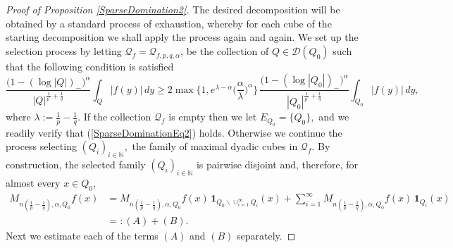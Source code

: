 \documentclass[11pt, a4paper,leqno]{amsart}
\theoremstyle{plain}
\numberwithin{equation}{section}
\theoremstyle{definition}
\theoremstyle{remark}
\begin{document}
\begin{proof}
[Proof of Proposition \ref{SparseDomination2}]The desired decomposition will
be obtained by a standard process of exhaustion, whereby for each cube of the
starting decomposition we shall apply the process again and again. We set up
the selection process by letting $\mathcal{Q}_{f}=\mathcal{Q}_{f,p,q,\alpha}$,
be the collection of  $Q\in \mathcal{D}( Q_{0})$ such that the
following condition is satisfied%
\begin{equation}
\frac{\big(1-(\log|Q|)_{-}\big)^{\alpha}}{|Q|^{\frac{1}{p^{\prime}}+\frac
{1}{q}}}\int_{Q}|f(y)|\,dy\geq2\max\bigg\{1,e^{\lambda-\alpha}\bigg(\frac
{\alpha}{\lambda}\bigg)^{\alpha}\bigg\}\,\frac{\big(1-(\log|Q_{0}%
|)_{-}\big)^{\alpha}}{|Q_{0}|^{\frac{1}{p^{\prime}}+\frac{1}{q}}}\int_{Q_{0}%
}|f(y)|\,dy,\label{ProofSparseDomination1}%
\end{equation}
where $\lambda:=\frac{1}{p}-\frac{1}{q}$. If the collection $\mathcal{Q}_{f}$
is empty then we let $E_{Q_{0}}=\{Q_{0}\},$ and we readily verify that
(\ref{SparseDominationEq2}) holds. Otherwise we continue the process selecting
$(Q_{i})_{i\in\mathbb{N}},$ the family of maximal dyadic cubes in
$\mathcal{Q}_{f}$. By construction, the selected family $(Q_{i})_{i\in
\mathbb{N}}$ is pairwise disjoint and, therefore, for almost every $x\in
Q_{0}$,%
\begin{align*}
M_{n(\frac{1}{p}-\frac{1}{q}),\alpha,Q_{0}}f(x) &  =M_{n(\frac{1}{p}-\frac
{1}{q}),\alpha,Q_{0}}f(x)\,\mathbf{1}_{Q_{0}\backslash\cup_{i=1}^{\infty}%
Q_{i}}(x) +\sum_{i=1}^{\infty}M_{n(\frac{1}{p}-\frac{1}{q}),\alpha,Q_{0}%
}f(x)\,\mathbf{1}_{Q_{i}}(x)  \nonumber\\
&  =:(A)+(B).
\end{align*}
Next we estimate each of the terms $(A)$ and $(B)$ separately.


\end{proof}
\end{document}
